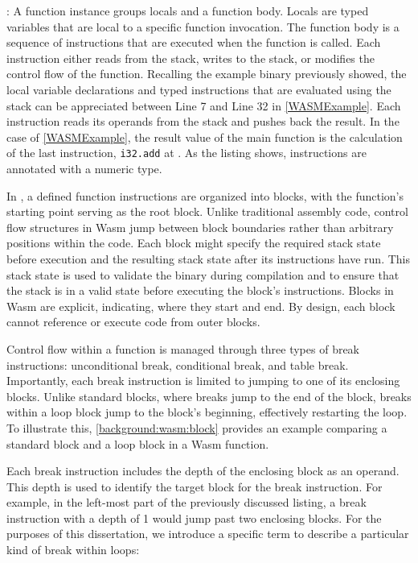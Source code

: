: 
A function instance groups locals and a function body.
Locals are typed variables that are local to a specific function invocation.
The function body is a sequence of instructions that are executed when the function is called.
Each instruction either reads from the stack, writes to the stack, or modifies the control flow of the function.
Recalling the example \wasm binary previously showed, 
the local variable declarations and typed instructions that are evaluated using the stack can be appreciated between Line 7 and Line 32 in \autoref{WASMExample}. 
Each instruction reads its operands from the stack and pushes back the result. 
In the case of \autoref{WASMExample}, the result value of the main function is the calculation of the last instruction, \texttt{i32.add} at . 
As the listing shows, instructions are annotated with a numeric type.



In \Wasm, a defined function instructions are organized into blocks, with the function's starting point serving as the root block. 
Unlike traditional assembly code, control flow structures in Wasm jump between block boundaries rather than arbitrary positions within the code. 
Each block might specify the required stack state before execution and the resulting stack state after its instructions have run. 
This stack state is used to validate the binary during compilation and to ensure that the stack is in a valid state before executing the block's instructions.
Blocks in Wasm are explicit, indicating, where they start and end.
By design, each block cannot reference or execute code from outer blocks.

Control flow within a function is managed through three types of break instructions: unconditional break, conditional break, and table break. 
Importantly, each break instruction is limited to jumping to one of its enclosing blocks.
Unlike standard blocks, where breaks jump to the end of the block, breaks within a loop block jump to the block's beginning, effectively restarting the loop. 
To illustrate this, \autoref{background:wasm:block} provides an example comparing a standard block and a loop block in a Wasm function.



Each break instruction includes the depth of the enclosing block as an operand. 
This depth is used to identify the target block for the break instruction. 
For example, in the left-most part of the previously discussed listing, a break instruction with a depth of 1 would jump past two enclosing blocks.
For the purposes of this dissertation, we introduce a specific term to describe a particular kind of break within loops:

